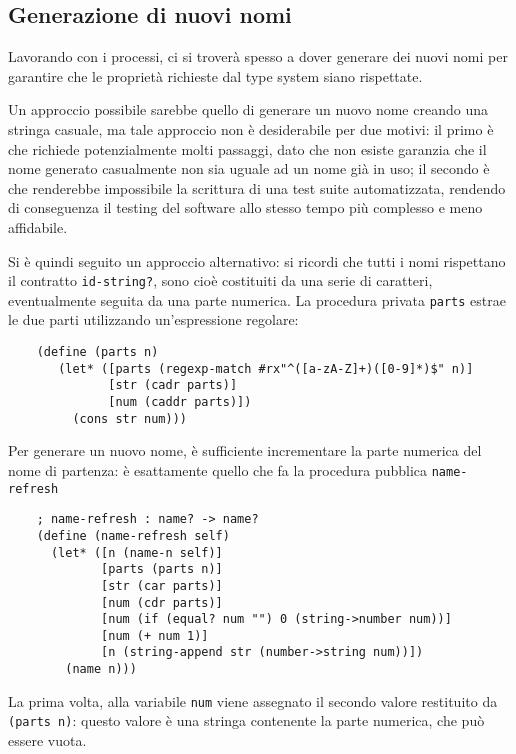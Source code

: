 \subsection{Generazione di nuovi nomi}

Lavorando con i processi, ci si trover\`a spesso a dover generare dei
nuovi nomi per garantire che le propriet\`a richieste dal type system
siano rispettate.

Un approccio possibile sarebbe quello di generare un nuovo nome creando
una stringa casuale, ma tale approccio non \`e desiderabile per due
motivi: il primo \`e che richiede potenzialmente molti passaggi, dato
che non esiste garanzia che il nome generato casualmente non sia uguale
ad un nome gi\`a in uso; il secondo \`e che renderebbe impossibile la
scrittura di una test suite automatizzata, rendendo di conseguenza il
testing del software allo stesso tempo pi\`u complesso e meno affidabile.

Si \`e quindi seguito un approccio alternativo: si ricordi che tutti i
nomi rispettano il contratto \lstinline{id-string?}, sono cio\`e
costituiti da una serie di caratteri, eventualmente seguita da una parte
numerica. La procedura privata \lstinline{parts} estrae le due parti
utilizzando un'espressione regolare:

\begin{lstlisting}
    (define (parts n)
       (let* ([parts (regexp-match #rx"^([a-zA-Z]+)([0-9]*)$" n)]
              [str (cadr parts)]
              [num (caddr parts)])
         (cons str num)))
\end{lstlisting}

Per generare un nuovo nome, \`e sufficiente incrementare la parte numerica
del nome di partenza: \`e esattamente quello che fa la procedura pubblica
\lstinline{name-refresh}

\begin{lstlisting}
    ; name-refresh : name? -> name?
    (define (name-refresh self)
      (let* ([n (name-n self)]
             [parts (parts n)]
             [str (car parts)]
             [num (cdr parts)]
             [num (if (equal? num "") 0 (string->number num))]
             [num (+ num 1)]
             [n (string-append str (number->string num))])
        (name n)))
\end{lstlisting}

La prima volta, alla variabile \lstinline{num} viene assegnato il secondo
valore restituito da \lstinline{(parts n)}: questo valore \`e una stringa
contenente la parte numerica, che pu\`o essere vuota.


